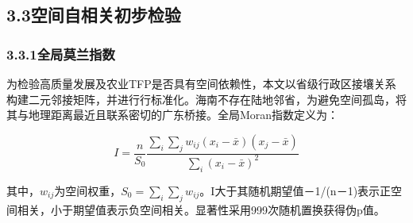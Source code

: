 \documentclass[UTF8,a4paper,12pt,fontset=windows]{ctexart}
\begin{document}
\subsection{3.3空间自相关初步检验}\label{ux7a7aux95f4ux81eaux76f8ux5173ux521dux6b65ux68c0ux9a8c}

\subsubsection{3.3.1全局莫兰指数}\label{ux5168ux5c40ux83abux5170ux6307ux6570}

为检验高质量发展及农业TFP是否具有空间依赖性，本文以省级行政区接壤关系构建二元邻接矩阵，并进行行标准化。海南不存在陆地邻省，为避免空间孤岛，将其与地理距离最近且联系密切的广东桥接。全局Moran指数定义为：

\[I=\frac{n}{S_0}\frac{\sum_i\sum_jw_{ij}(x_i-\bar{x})(x_j-\bar{x})}{\sum_i(x_i-\bar{x})^2}\]

其中，\(w_{ij}\)为空间权重，\(S_0=\sum_i\sum_jw_{ij}\)。I大于其随机期望值－1/(n－1)表示正空间相关，小于期望值表示负空间相关。显著性采用999次随机置换获得伪p值。
\end{document}
